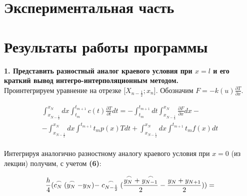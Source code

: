 \documentclass[a4paper,oneside,12pt]{extreport}
\begin{document}


\newpage 

\section{Экспериментальная часть}

\section*{Результаты работы программы}

\textbf{1. Представить разностный аналог краевого условия при $x = l$ и его краткий вывод интегро-интерполяционным методом.}\\


Проинтегрируем уравнение на отрезке [$X_{n - \frac{1}{2}}; x_{n}$]. 
Обозначим $F = -k(u) \frac{\partial T}{\partial x}$.

\begin{equation}
    \begin{aligned}
  \int^{x_{N}}_{x_{N-\frac{1}{2}}} dx \int^{t_{m + 1}}_{t_{m}} c(t) \frac{\partial T}{\partial t}dt = - \int^{t_{m + 1}}_{t_{m}}dt \int^{x_{N}}_{x_{N-\frac{1}{2}}} \frac{\partial F}{\partial x} dx - \\
       - \int^{x_{N}}_{x_{N-\frac{1}{2}}} dx \int^{t_{m + 1}}{t_{m}}p(x)Tdt + \int^{x_{N}}_{x_{N-\frac{1}{2}}} dx \int^{t_{m + 1}}{t_{m}} f(x)dt
    \end{aligned}
\end{equation}\\


Интегрируя аналогично разностному аналогу краевого условия при $x = 0$ (из лекции) получим, с учетом \textbf{(6)}:

\begin{equation*}
	\frac{h}{4} (\buildrel\,\,\frown\over{c_{N}}(\buildrel\,\,\frown\over{y_{N}} - y_{N}) - \buildrel\,\,\frown\over{c_{N - \frac{1}{2}}} (\frac{\buildrel\,\,\frown\over{y_{N}} + \buildrel\,\,\frown\over{y_{N - 1}}}{2} - \frac{y_{N} + y_{N + 1}}{2})) =
\end{equation*}
\end{document}
